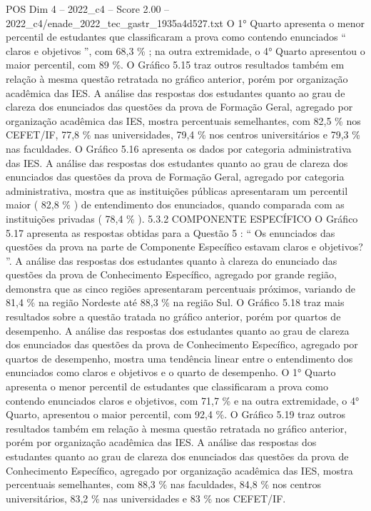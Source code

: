 \begin{textsample}{POS Dim 4 – 2022\_c4 – Score 2.00 – 2022\_c4/enade\_2022\_tec\_gastr\_1935a4d527.txt}
O 1{\EmojiFont °} Quarto apresenta o menor percentil de estudantes que classificaram a prova como contendo enunciados “ claros e objetivos ”, com 68,3 \% ; na outra extremidade, o 4{\EmojiFont °} Quarto apresentou o maior percentil, com 89 \%.
O Gráfico 5.15 traz outros resultados também em relação à mesma questão retratada no gráfico anterior, porém por organização acadêmica das IES.
A análise das respostas dos estudantes quanto ao grau de clareza dos enunciados das questões da prova de Formação Geral, agregado por organização acadêmica das IES, mostra percentuais semelhantes, com 82,5 \% nos CEFET/IF, 77,8 \% nas universidades, 79,4 \% nos centros universitários e 79,3 \% nas faculdades.
O Gráfico 5.16 apresenta os dados por categoria administrativa das IES.
A análise das respostas dos estudantes quanto ao grau de clareza dos enunciados das questões da prova de Formação Geral, agregado por categoria administrativa, mostra que as instituições públicas apresentaram um percentil maior ( 82,8 \% ) de entendimento dos enunciados, quando comparada com as instituições privadas ( 78,4 \% ). 5.3.2 COMPONENTE ESPECÍFICO O Gráfico 5.17 apresenta as respostas obtidas para a Questão 5 : “ Os enunciados das questões da prova na parte de Componente Específico estavam claros e objetivos? ”.
A análise das respostas dos estudantes quanto à clareza do enunciado das questões da prova de Conhecimento Específico, agregado por grande região, demonstra que as cinco regiões apresentaram percentuais próximos, variando de 81,4 \% na região Nordeste até 88,3 \% na região Sul.
O Gráfico 5.18 traz mais resultados sobre a questão tratada no gráfico anterior, porém por quartos de desempenho.
A análise das respostas dos estudantes quanto ao grau de clareza dos enunciados das questões da prova de Conhecimento Específico, agregado por quartos de desempenho, mostra uma tendência linear entre o entendimento dos enunciados como claros e objetivos e o quarto de desempenho.
O 1{\EmojiFont °} Quarto apresenta o menor percentil de estudantes que classificaram a prova como contendo enunciados claros e objetivos, com 71,7 \% e na outra extremidade, o 4{\EmojiFont °} Quarto, apresentou o maior percentil, com 92,4 \%.
O Gráfico 5.19 traz outros resultados também em relação à mesma questão retratada no gráfico anterior, porém por organização acadêmica das IES.
A análise das respostas dos estudantes quanto ao grau de clareza dos enunciados das questões da prova de Conhecimento Específico, agregado por organização acadêmica das IES, mostra percentuais semelhantes, com 88,3 \% nas faculdades, 84,8 \% nos centros universitários, 83,2 \% nas universidades e 83 \% nos CEFET/IF.

\end{textsample}
